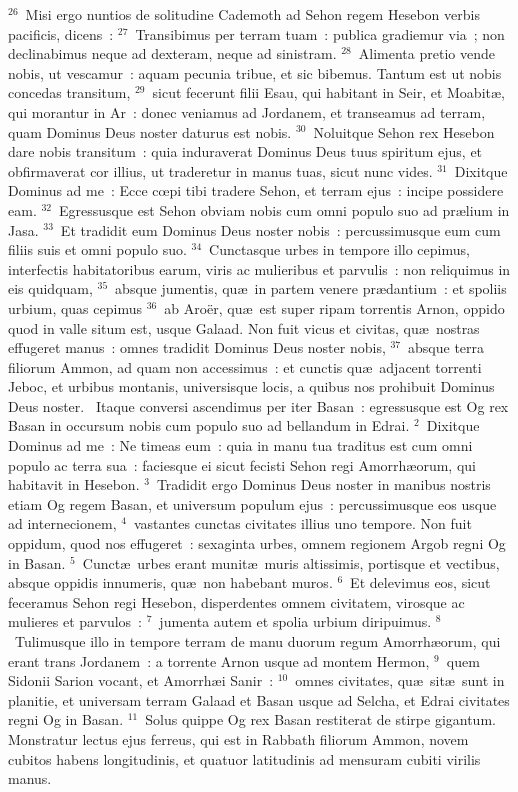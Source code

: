 ${}^{26}$~Misi ergo nuntios de solitudine Cademoth ad Sehon regem Hesebon verbis pacificis, dicens~:
${}^{27}$~Transibimus per terram tuam~: publica gradiemur via~; non declinabimus neque ad dexteram, neque ad sinistram.
${}^{28}$~Alimenta pretio vende nobis, ut vescamur~: aquam pecunia tribue, et sic bibemus. Tantum est ut nobis concedas transitum,
${}^{29}$~sicut fecerunt filii Esau, qui habitant in Seir, et Moabit\ae , qui morantur in Ar~: donec veniamus ad Jordanem, et transeamus ad terram, quam Dominus Deus noster daturus est nobis.
${}^{30}$~Noluitque Sehon rex Hesebon dare nobis transitum~: quia induraverat Dominus Deus tuus spiritum ejus, et obfirmaverat cor illius, ut traderetur in manus tuas, sicut nunc vides.
${}^{31}$~Dixitque Dominus ad me~: Ecce cœpi tibi tradere Sehon, et terram ejus~: incipe possidere eam.
${}^{32}$~Egressusque est Sehon obviam nobis cum omni populo suo ad pr\ae lium in Jasa.
${}^{33}$~Et tradidit eum Dominus Deus noster nobis~: percussimusque eum cum filiis suis et omni populo suo.
${}^{34}$~Cunctasque urbes in tempore illo cepimus, interfectis habitatoribus earum, viris ac mulieribus et parvulis~: non reliquimus in eis quidquam,
${}^{35}$~absque jumentis, qu\ae\ in partem venere pr\ae dantium~: et spoliis urbium, quas cepimus
${}^{36}$~ab Aro\"er, qu\ae\ est super ripam torrentis Arnon, oppido quod in valle situm est, usque Galaad. Non fuit vicus et civitas, qu\ae\ nostras effugeret manus~: omnes tradidit Dominus Deus noster nobis,
${}^{37}$~absque terra filiorum Ammon, ad quam non accessimus~: et cunctis qu\ae\ adjacent torrenti Jeboc, et urbibus montanis, universisque locis, a quibus nos prohibuit Dominus Deus noster.
~Itaque conversi ascendimus per iter Basan~: egressusque est Og rex Basan in occursum nobis cum populo suo ad bellandum in Edrai.
${}^{2}$~Dixitque Dominus ad me~: Ne timeas eum~: quia in manu tua traditus est cum omni populo ac terra sua~: faciesque ei sicut fecisti Sehon regi Amorrh\ae orum, qui habitavit in Hesebon.
${}^{3}$~Tradidit ergo Dominus Deus noster in manibus nostris etiam Og regem Basan, et universum populum ejus~: percussimusque eos usque ad internecionem,
${}^{4}$~vastantes cunctas civitates illius uno tempore. Non fuit oppidum, quod nos effugeret~: sexaginta urbes, omnem regionem Argob regni Og in Basan.
${}^{5}$~Cunct\ae\ urbes erant munit\ae\ muris altissimis, portisque et vectibus, absque oppidis innumeris, qu\ae\ non habebant muros.
${}^{6}$~Et delevimus eos, sicut feceramus Sehon regi Hesebon, disperdentes omnem civitatem, virosque ac mulieres et parvulos~:
${}^{7}$~jumenta autem et spolia urbium diripuimus.
${}^{8}$~Tulimusque illo in tempore terram de manu duorum regum Amorrh\ae orum, qui erant trans Jordanem~: a torrente Arnon usque ad montem Hermon,
${}^{9}$~quem Sidonii Sarion vocant, et Amorrh\ae i Sanir~:
${}^{10}$~omnes civitates, qu\ae\ sit\ae\ sunt in planitie, et universam terram Galaad et Basan usque ad Selcha, et Edrai civitates regni Og in Basan.
${}^{11}$~Solus quippe Og rex Basan restiterat de stirpe gigantum. Monstratur lectus ejus ferreus, qui est in Rabbath filiorum Ammon, novem cubitos habens longitudinis, et quatuor latitudinis ad mensuram cubiti virilis manus.


